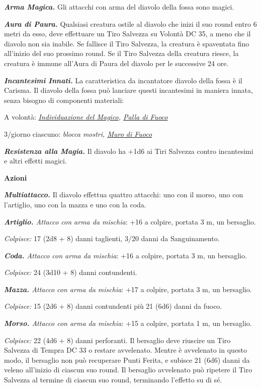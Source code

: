 \begin{multicols}{2}
{\emph{\textbf{Arma Magica.}} Gli attacchi con arma del diavolo della fossa sono magici.

\emph{\textbf{Aura di Paura.}} Qualsiasi creatura ostile al diavolo che inizi il suo round entro 6 metri da esso, deve effettuare un Tiro Salvezza su Volontà DC 35, a meno che il diavolo non sia inabile. Se fallisce il Tiro Salvezza, la creatura è spaventata fino all'inizio del suo prossimo round. Se il Tiro Salvezza della creatura riesce, la creatura è immune all'Aura di Paura del diavolo per le successive 24 ore.

\emph{\textbf{Incantesimi Innati.}} La caratteristica da incantatore diavolo della fossa è il Carisma. Il diavolo della fossa può lanciare questi incantesimi in maniera innata, senza bisogno di componenti materiali:

A volontà: \emph{\hyperlink{Individuazione del Magico}{Individuazione del Magico}, \hyperlink{Palla di Fuoco}{Palla di Fuoco}}

3/giorno ciascuno: \emph{blocca mostri, \hyperlink{Muro di Fuoco}{Muro di Fuoco}}

\emph{\textbf{Resistenza alla Magia.}} Il diavolo ha +1d6 ai Tiri Salvezza contro incantesimi e altri effetti magici.

\textbf{Azioni}

\emph{\textbf{Multiattacco.}} Il diavolo effettua quattro attacchi: uno con il morso, uno con l'artiglio, uno con la mazza e uno con la coda.

\emph{\textbf{Artiglio.} Attacco con arma da mischia}: +16 a colpire, portata 3 m, un bersaglio.

\emph{Colpisce:} 17 (2d8 + 8) danni taglienti, 3/20 danni da Sanguinamento.

\emph{\textbf{Coda.} Attacco con arma da mischia}: +16 a colpire, portata 3 m, un bersaglio.

\emph{Colpisce:} 24 (3d10 + 8) danni contundenti.

\emph{\textbf{Mazza.} Attacco con arma da mischia}: +17 a colpire, portata 3 m, un bersaglio.

\emph{Colpisce:} 15 (2d6 + 8) danni contundenti più 21 (6d6) danni da fuoco.

\emph{\textbf{Morso.} Attacco con arma da mischia}: +15 a colpire, portata 1 m, un bersaglio.

\emph{Colpisce:} 22 (4d6 + 8) danni perforanti. Il bersaglio deve riuscire un Tiro Salvezza di Tempra DC 33 o restare avvelenato. Mentre è avvelenato in questo modo, il bersaglio non può recuperare Punti Ferita, e subisce 21 (6d6) danni da veleno all'inizio di ciascun suo round. Il bersaglio avvelenato può ripetere il Tiro Salvezza al termine di ciascun suo round, terminando l'effetto su di sé.

}
\end{multicols}
